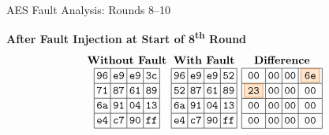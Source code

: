 \documentclass{beamer}
\newenvironment{tres important}[2][]{
	\setkeys{EmphEqEnv}{#2}
	\setkeys{EmphEqOpt}{box={\setlength{\fboxsep}{10pt}\fcolorbox{myNewColorA}{white}},#1}
	\EmphEqMainEnv}
{\endEmphEqMainEnv}
\begin{document}
\begin{frame}[fragile]{AES Fault Analysis: Rounds 8–10}
      \scriptsize %
      
    \vspace{1ex}
    \textbf{After Fault Injection at Start of 8\textsuperscript{th} Round}
    \[
    \setlength{\arraycolsep}{2pt}
    \renewcommand{\arraystretch}{1.1}
    \begin{array}{ccc}
    \textbf{Without Fault} & \textbf{With Fault} & \textbf{Difference} \\
    
    \begin{array}{|c|c|c|c|}
    \hline \texttt{96} & \texttt{e9} & \texttt{e9} & \texttt{3c} \\
    \hline \texttt{71} & \texttt{87} & \texttt{61} & \texttt{89} \\
    \hline \texttt{6a} & \texttt{91} & \texttt{04} & \texttt{13} \\
    \hline \texttt{e4} & \texttt{c7} & \texttt{90} & \texttt{ff} \\
    \hline
    \end{array}
    &
    
    \begin{array}{|c|c|c|c|}
    \hline \texttt{96} & \texttt{e9} & \texttt{e9} & \texttt{52} \\
    \hline \texttt{52} & \texttt{87} & \texttt{61} & \texttt{89} \\
    \hline \texttt{6a} & \texttt{91} & \texttt{04} & \texttt{13} \\
    \hline \texttt{e4} & \texttt{c7} & \texttt{90} & \texttt{ff} \\
    \hline
    \end{array}
    &
    
    \begin{array}{|c|c|c|c|}
    \hline \texttt{00} & \texttt{00} & \texttt{00} & \fcolorbox{orange!80!black}{orange!20}{\texttt{6e}} \\
    \hline \fcolorbox{orange!80!black}{orange!20}{\texttt{23}} & \texttt{00} & \texttt{00} & \texttt{00} \\
    \hline \texttt{00} & \texttt{00} & \texttt{00} & \texttt{00} \\
    \hline \texttt{00} & \texttt{00} & \texttt{00} & \texttt{00} \\
    \hline
    \end{array}
    \end{array}
    \]
    

\end{frame}
\end{document}
